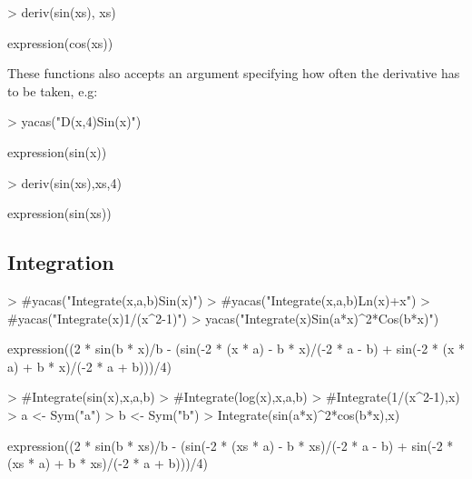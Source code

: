 \documentclass[]{article}
\begin{document}
\begin{Schunk}
\begin{Sinput}
> deriv(sin(xs), xs)
\end{Sinput}
\begin{Soutput}
expression(cos(xs))
\end{Soutput}
\end{Schunk}

These functions also accepts an argument specifying how often the
derivative has to be taken, e.g:
\begin{Schunk}
\begin{Sinput}
> yacas("D(x,4)Sin(x)")
\end{Sinput}
\begin{Soutput}
expression(sin(x))
\end{Soutput}
\end{Schunk}

\begin{Schunk}
\begin{Sinput}
> deriv(sin(xs),xs,4)
\end{Sinput}
\begin{Soutput}
expression(sin(xs))
\end{Soutput}
\end{Schunk}

\subsection{Integration}


\begin{Schunk}
\begin{Sinput}
> #yacas("Integrate(x,a,b)Sin(x)")
> #yacas("Integrate(x,a,b)Ln(x)+x")
> #yacas("Integrate(x)1/(x^2-1)")
> yacas("Integrate(x)Sin(a*x)^2*Cos(b*x)")
\end{Sinput}
\begin{Soutput}
expression((2 * sin(b * x)/b - (sin(-2 * (x * a) - b * x)/(-2 * 
    a - b) + sin(-2 * (x * a) + b * x)/(-2 * a + b)))/4)
\end{Soutput}
\end{Schunk}

\begin{Schunk}
\begin{Sinput}
> #Integrate(sin(x),x,a,b)
> #Integrate(log(x),x,a,b)
> #Integrate(1/(x^2-1),x)
> a <- Sym("a")
> b <- Sym("b")
> Integrate(sin(a*x)^2*cos(b*x),x)
\end{Sinput}
\begin{Soutput}
expression((2 * sin(b * xs)/b - (sin(-2 * (xs * a) - b * xs)/(-2 * 
    a - b) + sin(-2 * (xs * a) + b * xs)/(-2 * a + b)))/4)
\end{Soutput}
\end{Schunk}
\end{document}
